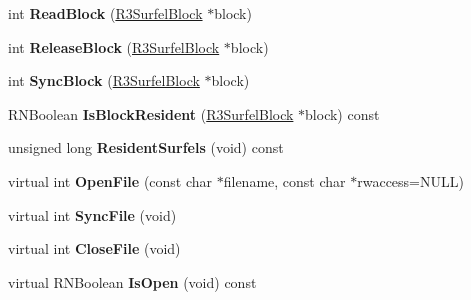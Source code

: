 \begin{DoxyCompactItemize}
\item 
int {\bfseries Read\+Block} (\hyperlink{class_r3_surfel_block}{R3\+Surfel\+Block} $\ast$block)\hypertarget{class_r3_surfel_database_a1c773b91bbc66bc898b32bbe75675919}{}\label{class_r3_surfel_database_a1c773b91bbc66bc898b32bbe75675919}

\item 
int {\bfseries Release\+Block} (\hyperlink{class_r3_surfel_block}{R3\+Surfel\+Block} $\ast$block)\hypertarget{class_r3_surfel_database_a0b38b20cdd261c708bd974551a56b63b}{}\label{class_r3_surfel_database_a0b38b20cdd261c708bd974551a56b63b}

\item 
int {\bfseries Sync\+Block} (\hyperlink{class_r3_surfel_block}{R3\+Surfel\+Block} $\ast$block)\hypertarget{class_r3_surfel_database_a4eafc8317e3efccd564f0b9946ee8915}{}\label{class_r3_surfel_database_a4eafc8317e3efccd564f0b9946ee8915}

\item 
R\+N\+Boolean {\bfseries Is\+Block\+Resident} (\hyperlink{class_r3_surfel_block}{R3\+Surfel\+Block} $\ast$block) const \hypertarget{class_r3_surfel_database_a2a0d5ec9d161c6eea35d73d46a22c62e}{}\label{class_r3_surfel_database_a2a0d5ec9d161c6eea35d73d46a22c62e}

\item 
unsigned long {\bfseries Resident\+Surfels} (void) const \hypertarget{class_r3_surfel_database_a2d804d7f7a5af0955a9b9b43c66d5710}{}\label{class_r3_surfel_database_a2d804d7f7a5af0955a9b9b43c66d5710}

\item 
virtual int {\bfseries Open\+File} (const char $\ast$filename, const char $\ast$rwaccess=N\+U\+LL)\hypertarget{class_r3_surfel_database_a4a976c018f6706ef97432fdfa15ae1a1}{}\label{class_r3_surfel_database_a4a976c018f6706ef97432fdfa15ae1a1}

\item 
virtual int {\bfseries Sync\+File} (void)\hypertarget{class_r3_surfel_database_a76932725db5356b6446a75e2d8fdb842}{}\label{class_r3_surfel_database_a76932725db5356b6446a75e2d8fdb842}

\item 
virtual int {\bfseries Close\+File} (void)\hypertarget{class_r3_surfel_database_a142b373a97b84aca4a0ba77a3e1483bd}{}\label{class_r3_surfel_database_a142b373a97b84aca4a0ba77a3e1483bd}

\item 
virtual R\+N\+Boolean {\bfseries Is\+Open} (void) const \hypertarget{class_r3_surfel_database_a05a768f388d44804ef80d88ade70bf8b}{}\label{class_r3_surfel_database_a05a768f388d44804ef80d88ade70bf8b}


\end{DoxyCompactItemize}
